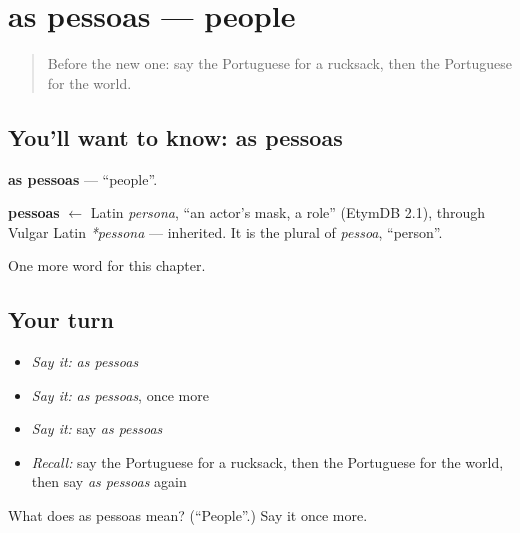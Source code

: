 \section[as pessoas]{as pessoas — people}

\label{lesson:PT-C102-pessoas}



\begin{quote}
Before the new one: say the Portuguese for a rucksack, then the Portuguese for the world.
\end{quote}

\subsection*{You'll want to know: as pessoas}
\textbf{as pessoas} — \textquotedblleft{}people\textquotedblright{}.

\begin{cousinweb}
\textbf{pessoas} $\leftarrow$ Latin \emph{persona}, \textquotedblleft{}an actor's mask, a role\textquotedblright{} (EtymDB 2.1), through Vulgar Latin \emph{*pessona} — inherited. It is the plural of \emph{pessoa}, \textquotedblleft{}person\textquotedblright{}.
\end{cousinweb}

\begin{grammarlens}[title={What you've built}]
One more word for this chapter.
\end{grammarlens}

\subsection*{Your turn}
\begin{itemize}
\raggedright
  \item \emph{Say it:} \emph{as pessoas}
  \item \emph{Say it:} \emph{as pessoas}, once more
  \item \emph{Say it:} say \emph{as pessoas}
  \item \emph{Recall:} say the Portuguese for a rucksack, then the Portuguese for the world, then say \emph{as pessoas} again
\end{itemize}

\begin{tcolorbox}[breakable,colback=teal!4,colframe=teal!35!black,title={Before you move on}]
What does as pessoas mean? (\textquotedblleft{}People\textquotedblright{}.) Say it once more.
\end{tcolorbox}
